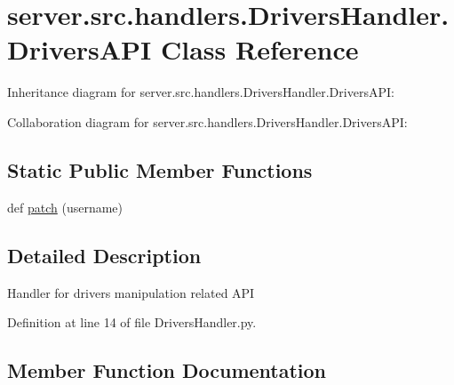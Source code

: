 \hypertarget{classserver_1_1src_1_1handlers_1_1_drivers_handler_1_1_drivers_a_p_i}{}\section{server.\+src.\+handlers.\+Drivers\+Handler.\+Drivers\+A\+PI Class Reference}
\label{classserver_1_1src_1_1handlers_1_1_drivers_handler_1_1_drivers_a_p_i}


Inheritance diagram for server.\+src.\+handlers.\+Drivers\+Handler.\+Drivers\+A\+PI\+:


Collaboration diagram for server.\+src.\+handlers.\+Drivers\+Handler.\+Drivers\+A\+PI\+:
\subsection*{Static Public Member Functions}
\begin{DoxyCompactItemize}
\item 
def \hyperlink{classserver_1_1src_1_1handlers_1_1_drivers_handler_1_1_drivers_a_p_i_a847cee8154f1d5445e25b7070194d65a}{patch} (username)
\end{DoxyCompactItemize}


\subsection{Detailed Description}
\begin{DoxyVerb}Handler for drivers manipulation related API\end{DoxyVerb}
 

Definition at line 14 of file Drivers\+Handler.\+py.



\subsection{Member Function Documentation}
